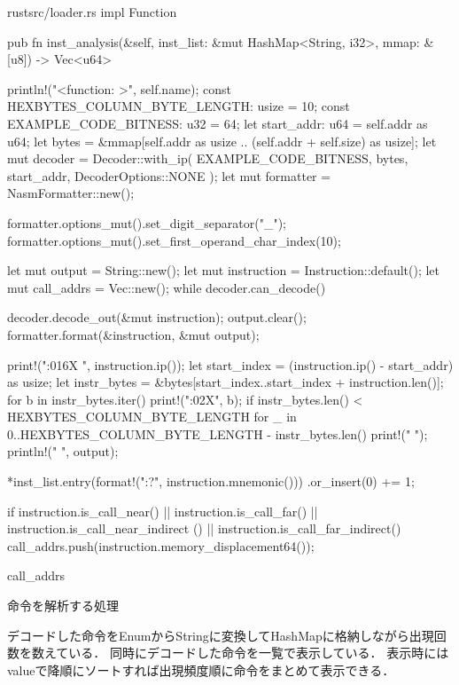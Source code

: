 \documentclass[12pt,a4paper,dvipdfmx]{jsarticle}
\begin{document}
\begin{longlisting}
\begin{myminted}{rust}{src/loader.rs}
impl Function {
    pub fn inst_analysis(&self, inst_list: &mut HashMap<String, i32>, mmap: &[u8]) -> Vec<u64> {
        println!("<function: {}>", self.name);
        const HEXBYTES_COLUMN_BYTE_LENGTH: usize = 10;
        const EXAMPLE_CODE_BITNESS: u32 = 64;
        let start_addr: u64 = self.addr as u64;
        let bytes = &mmap[self.addr as usize .. (self.addr + self.size) as usize];
        let mut decoder = Decoder::with_ip(
            EXAMPLE_CODE_BITNESS,
            bytes,
            start_addr,
            DecoderOptions::NONE
        );
        let mut formatter = NasmFormatter::new();

        formatter.options_mut().set_digit_separator("_");
        formatter.options_mut().set_first_operand_char_index(10);

        let mut output = String::new();
        let mut instruction = Instruction::default();
        let mut call_addrs = Vec::new();
        while decoder.can_decode() {
            decoder.decode_out(&mut instruction);
            output.clear();
            formatter.format(&instruction, &mut output);

            print!("{:016X} ", instruction.ip());
            let start_index = (instruction.ip() - start_addr) as usize;
            let instr_bytes = &bytes[start_index..start_index + instruction.len()];
            for b in instr_bytes.iter() {
                print!("{:02X}", b);
            }
            if instr_bytes.len() < HEXBYTES_COLUMN_BYTE_LENGTH {
                for _ in 0..HEXBYTES_COLUMN_BYTE_LENGTH - instr_bytes.len() {
                    print!("  ");
                }
            }
            println!(" {}", output);

            *inst_list.entry(format!("{:?}", instruction.mnemonic()))
                .or_insert(0) += 1;

            if instruction.is_call_near() || instruction.is_call_far() ||
               instruction.is_call_near_indirect () || instruction.is_call_far_indirect() {
                call_addrs.push(instruction.memory_displacement64());
            }
        }

        call_addrs
    }
}
\end{myminted}
\caption{命令を解析する処理}
\label{lst:inst}
\end{longlisting}

デコードした命令をEnumからStringに変換してHashMapに格納しながら出現回数を数えている．
同時にデコードした命令を一覧で表示している．
表示時にはvalueで降順にソートすれば出現頻度順に命令をまとめて表示できる．
\end{document}
